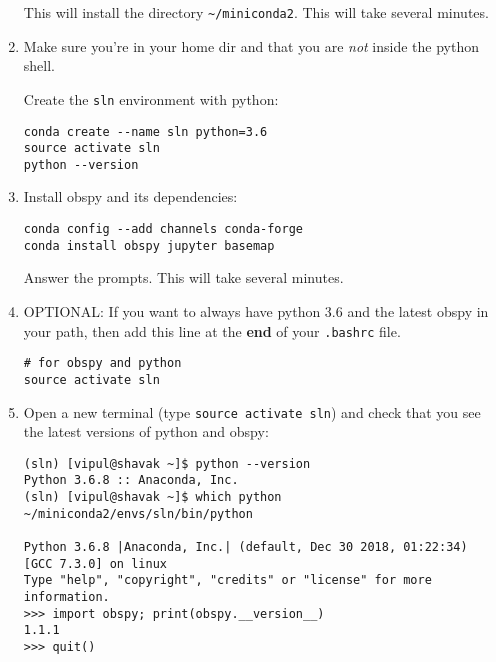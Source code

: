 \documentclass[10pt,titlepage,fleqn]{article}
\begin{document}
\begin{enumerate}
This will install the directory \verb+~/miniconda2+. This will take several minutes.

\label{step:conda_install_2}

\item Make sure you're in your home dir and that you are {\em not} inside the python shell.

Create the \verb+sln+ environment with python:
%
%
\begin{verbatim}
conda create --name sln python=3.6
source activate sln
python --version
\end{verbatim}
%
\label{step:create_env}
\item Install obspy and its dependencies:
%
\begin{verbatim}
conda config --add channels conda-forge
conda install obspy jupyter basemap
\end{verbatim}

Answer the prompts. This will take several minutes.

\label{step:install}

\item OPTIONAL: If you want to always have python 3.6 and the latest obspy in your path, then add this line at the {\bf end} of your \verb+.bashrc+ file.
%
\begin{verbatim}
# for obspy and python
source activate sln
\end{verbatim}

\item Open a new terminal (type \verb+source activate sln+) and check that you see the latest versions of python and obspy:
%
\begin{verbatim}
(sln) [vipul@shavak ~]$ python --version
Python 3.6.8 :: Anaconda, Inc.
(sln) [vipul@shavak ~]$ which python
~/miniconda2/envs/sln/bin/python

Python 3.6.8 |Anaconda, Inc.| (default, Dec 30 2018, 01:22:34) 
[GCC 7.3.0] on linux
Type "help", "copyright", "credits" or "license" for more information.
>>> import obspy; print(obspy.__version__)
1.1.1
>>> quit()
\end{verbatim}


\end{enumerate}
\end{document}
